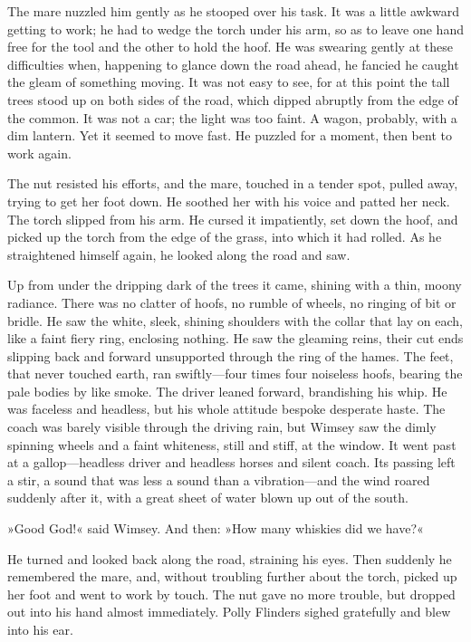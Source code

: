 The mare nuzzled him gently as he stooped over his task. It was a little awkward getting to work; he had to wedge the torch under his arm, so as to leave one hand free for the tool and the other to hold the hoof. He was swearing gently at these difficulties when, happening to glance down the road ahead, he fancied he caught the gleam of something moving. It was not easy to see, for at this point the tall trees stood up on both sides of the road, which dipped abruptly from the edge of the common. It was not a car; the light was too faint. A wagon, probably, with a dim lantern. Yet it seemed to move fast. He puzzled for a moment, then bent to work again.

The nut resisted his efforts, and the mare, touched in a tender spot, pulled away, trying to get her foot down. He soothed her with his voice and patted her neck. The torch slipped from his arm. He cursed it impatiently, set down the hoof, and picked up the torch from the edge of the grass, into which it had rolled. As he straightened himself again, he looked along the road and saw.

Up from under the dripping dark of the trees it came, shining with a thin, moony radiance. There was no clatter of hoofs, no rumble of wheels, no ringing of bit or bridle. He saw the white, sleek, shining shoulders with the collar that lay on each, like a faint fiery ring, enclosing nothing. He saw the gleaming reins, their cut ends slipping back and forward unsupported through the ring of the hames. The feet, that never touched earth, ran swiftly—four times four noiseless hoofs, bearing the pale bodies by like smoke. The driver leaned forward, brandishing his whip. He was faceless and headless, but his whole attitude bespoke desperate haste. The coach was barely visible through the driving rain, but Wimsey saw the dimly spinning wheels and a faint whiteness, still and stiff, at the window. It went past at a gallop—headless driver and headless horses and silent coach. Its passing left a stir, a sound that was less a sound than a vibration—and the wind roared suddenly after it, with a great sheet of water blown up out of the south.

»Good God!« said Wimsey. And then: »How many whiskies did we have?«

He turned and looked back along the road, straining his eyes. Then suddenly he remembered the mare, and, without troubling further about the torch, picked up her foot and went to work by touch. The nut gave no more trouble, but dropped out into his hand almost immediately. Polly Flinders sighed gratefully and blew into his ear.


